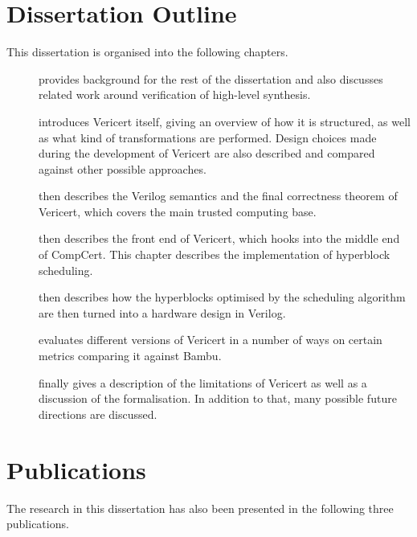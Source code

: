 \section{Dissertation Outline}

This dissertation is organised into the following chapters.

\begin{description}
\item[] provides background for the rest of the
  dissertation and also discusses related work around verification of high-level
  synthesis.
\item[] introduces Vericert itself, giving an
  overview of how it is structured, as well as what kind of transformations are
  performed.  Design choices made during the development of Vericert are also
  described and compared against other possible approaches.
\item[] then describes the Verilog semantics and the final correctness theorem of Vericert, which covers the main trusted computing base.
\item[] then describes the front end of
  Vericert, which hooks into the middle end of \gls{CompCert}.  This chapter
  describes the implementation of hyperblock scheduling.
\item[] then describes how the hyperblocks
  optimised by the scheduling algorithm are then turned into a hardware design
  in Verilog.
\item[] evaluates different versions of Vericert in a
  number of ways on certain metrics comparing it against Bambu.
\item[] finally gives a description of the limitations of
  Vericert as well as a discussion of the formalisation.  In addition to that,
  many possible future directions are discussed.
\end{description}

\section{Publications}

The research in this dissertation has also been presented in the following three
publications.

